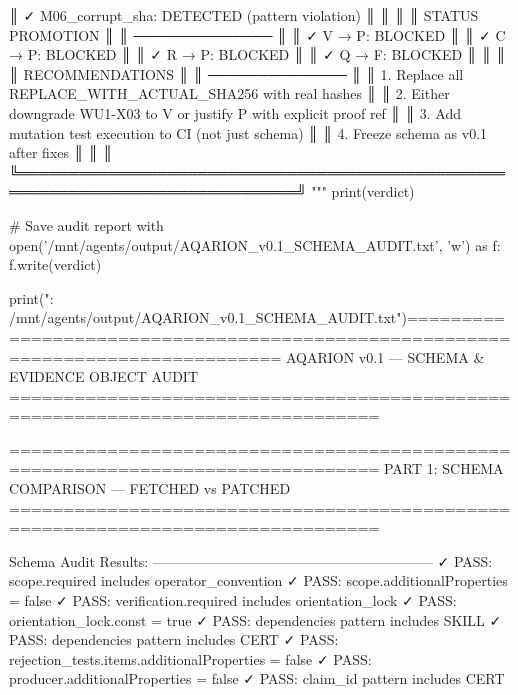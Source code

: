 ║  ✓ M06_corrupt_sha: DETECTED (pattern violation)                            ║
║                                                                              ║
║  STATUS PROMOTION                                                            ║
║  ──────────────                                                              ║
║  ✓ V → P: BLOCKED                                                           ║
║  ✓ C → P: BLOCKED                                                           ║
║  ✓ R → P: BLOCKED                                                           ║
║  ✓ Q → F: BLOCKED                                                           ║
║                                                                              ║
║  RECOMMENDATIONS                                                             ║
║  ──────────────                                                              ║
║  1. Replace all REPLACE_WITH_ACTUAL_SHA256 with real hashes                 ║
║  2. Either downgrade WU1-X03 to V or justify P with explicit proof ref      ║
║  3. Add mutation test execution to CI (not just schema)                       ║
║  4. Freeze schema as v0.1 after fixes                                        ║
║                                                                              ║
╚══════════════════════════════════════════════════════════════════════════════╝
"""
print(verdict)

# Save audit report
with open('/mnt/agents/output/AQARION_v0.1_SCHEMA_AUDIT.txt', 'w') as f:
    f.write(verdict)

print("\nSaved: /mnt/agents/output/AQARION_v0.1_SCHEMA_AUDIT.txt")================================================================================
AQARION v0.1 — SCHEMA & EVIDENCE OBJECT AUDIT
================================================================================

================================================================================
PART 1: SCHEMA COMPARISON — FETCHED vs PATCHED
================================================================================

Schema Audit Results:
------------------------------------------------------------
  ✓ PASS: scope.required includes operator_convention
  ✓ PASS: scope.additionalProperties = false
  ✓ PASS: verification.required includes orientation_lock
  ✓ PASS: orientation_lock.const = true
  ✓ PASS: dependencies pattern includes SKILL
  ✓ PASS: dependencies pattern includes CERT
  ✓ PASS: rejection_tests.items.additionalProperties = false
  ✓ PASS: producer.additionalProperties = false
  ✓ PASS: claim_id pattern includes CERT

